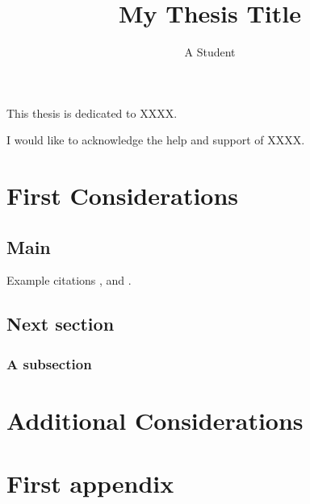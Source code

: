 \documentclass{ncfthesis}                             %
\title{My Thesis Title}
\author{A Student}
\begin{document}
\frontmatter

\maketitle

\begin{dedication}
This thesis is dedicated to XXXX.
\end{dedication}

\begin{acknowledgements}
I would like to acknowledge the help and support of XXXX.
\end{acknowledgements}

\begin{abstract}
\kant[1] %
\end{abstract}

\tableofcontents

\mainmatter


\chapter{First Considerations}
\section{Main}
\kant[2-4]
Example citations \cite{hitchin1987}, \cite{jaffe1980} and \cite{joyce2012}.
\section{Next section}
\kant[5-6]
\subsection{A subsection}
\kant[7]

\chapter{Additional Considerations}
\kant[8-10]

\appendix
\chapter{First appendix}

\end{document}
